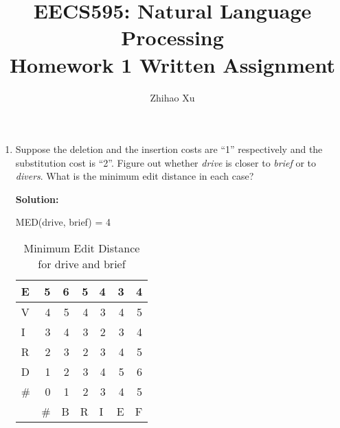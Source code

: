 \documentclass[11pt]{article}
\title{EECS595: Natural Language Processing \\Homework 1 Written Assignment}
\author{Zhihao Xu}
\begin{document}
\maketitle


\begin{enumerate}



\item Suppose the deletion and the insertion costs are ``1'' respectively and the substitution cost is ``2''. Figure out whether {\em drive} is closer to {\em brief} or to {\em divers}.  What is the minimum edit distance in each case? 

\textbf{Solution:}

MED(drive, brief) = 4
\begin{table}[htbp]
  \centering
    \begin{tabular}{|r|l|l|l|l|l|l|}
    \toprule
    \multicolumn{1}{|l|}{E} & \multicolumn{1}{r|}{5} & \multicolumn{1}{r|}{6} & \multicolumn{1}{r|}{5} & \multicolumn{1}{r|}{4} & \multicolumn{1}{r|}{3} & \multicolumn{1}{r|}{4} \\
    \midrule
    \multicolumn{1}{|l|}{V} & \multicolumn{1}{r|}{4} & \multicolumn{1}{r|}{5} & \multicolumn{1}{r|}{4} & \multicolumn{1}{r|}{3} & \multicolumn{1}{r|}{4} & \multicolumn{1}{r|}{5} \\
    \midrule
    \multicolumn{1}{|l|}{I} & \multicolumn{1}{r|}{3} & \multicolumn{1}{r|}{4} & \multicolumn{1}{r|}{3} & \multicolumn{1}{r|}{2} & \multicolumn{1}{r|}{3} & \multicolumn{1}{r|}{4} \\
    \midrule
    \multicolumn{1}{|l|}{R} & \multicolumn{1}{r|}{2} & \multicolumn{1}{r|}{3} & \multicolumn{1}{r|}{2} & \multicolumn{1}{r|}{3} & \multicolumn{1}{r|}{4} & \multicolumn{1}{r|}{5} \\
    \midrule
    \multicolumn{1}{|l|}{D} & \multicolumn{1}{r|}{1} & \multicolumn{1}{r|}{2} & \multicolumn{1}{r|}{3} & \multicolumn{1}{r|}{4} & \multicolumn{1}{r|}{5} & \multicolumn{1}{r|}{6} \\
    \midrule
    \multicolumn{1}{|l|}{\#} & \multicolumn{1}{r|}{0} & \multicolumn{1}{r|}{1} & \multicolumn{1}{r|}{2} & \multicolumn{1}{r|}{3} & \multicolumn{1}{r|}{4} & \multicolumn{1}{r|}{5} \\
    \midrule
          & \#    & B     & R     & I     & E     & F \\
    \bottomrule
    \end{tabular}%
    \caption{Minimum Edit Distance for drive and brief}
\end{table}%


\end{enumerate}
\end{document}
